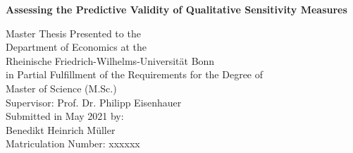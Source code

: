 \begin{titlepage}

\begin{center}

\vspace*{1.0cm}

{\LARGE
\bfseries Assessing the Predictive Validity of Qualitative Sensitivity Measures \\
\vspace*{0.5cm}
}%


{\large
\vspace*{4.0cm}
Master Thesis Presented to the\\
\vspace*{0.25cm}
Department of Economics at the\\
\vspace*{0.25cm}
Rheinische Friedrich-Wilhelms-Universität Bonn\\

\vspace*{2.0cm}
in Partial Fulfillment of the Requirements for the Degree of\\
\vspace*{0.25cm}
Master of Science (M.Sc.)\\

\vspace*{4.0cm}
Supervisor: Prof. Dr. Philipp Eisenhauer\\

\vspace*{2.0cm}
Submitted in May 2021 by:\\
Benedikt Heinrich Müller\\
Matriculation Number: xxxxxx
}

\end{center}

\end{titlepage}